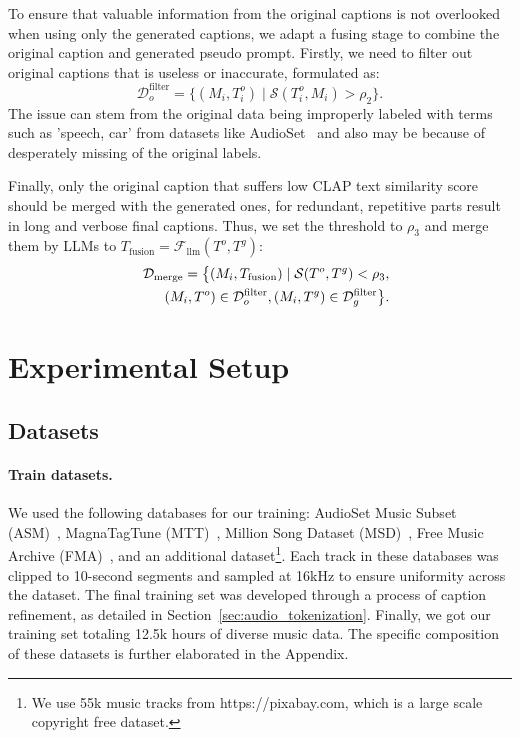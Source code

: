 To ensure that valuable information from the original captions is not overlooked when using only the generated captions, we adapt a fusing stage to combine the original caption and generated pseudo prompt. Firstly, we need to filter out original captions that is useless or inaccurate, formulated as:
\begin{equation}
\mathcal{D}^{\text{filter}}_{o} = \{(M_i, T^{o}_i) \mid \mathcal{S}(T^{o}_i, M_i) > \rho_2\}.
\end{equation}
The issue can stem from the original data being improperly labeled with terms such as 'speech, car' from datasets like AudioSet~\citep{gemmeke2017audio} and also may be because of desperately missing of the original labels.

Finally, only the original caption that suffers low CLAP text similarity score should be merged with the generated ones, for redundant, repetitive parts result in long and verbose final captions. Thus, we set the threshold to \(\rho_3\) and merge them by LLMs to \(T_{\text{fusion}} = \mathcal{F}_{\text{llm}}(T^{o}, T^{g})\):
\begin{equation}
\begin{aligned}
\mathcal{D}_{\text{merge}} = \big\{ (M_i, T_{\text{fusion}}) \mid \mathcal{S}(T^{o}, T^{g}) < \rho_3, \\
\hspace*{2.5em}(M_i, T^{o}) \in \mathcal{D}^{\text{filter}}_{o}, (M_i, T^{g}) \in \mathcal{D}^{\text{filter}}_{g} \big\}.
\end{aligned}
\end{equation}

\section{Experimental Setup}\label{sec:exp}

\subsection{Datasets}\label{sec:datasets}
\paragraph{Train datasets.} We used the following databases for our training: AudioSet Music Subset (ASM)~\citep{gemmeke2017audio}, MagnaTagTune (MTT)~\citep{law2009evaluation}, Million Song Dataset (MSD)~\citep{bertin2011million}, Free Music Archive (FMA)~\citep{defferrard2016fma}, and an additional dataset\footnote{We use 55k music tracks from https://pixabay.com, which is a large scale copyright free dataset.}. Each track in these databases was clipped to 10-second segments and sampled at 16kHz to ensure uniformity across the dataset. The final training set was developed through a process of caption refinement, as detailed in Section~\ref{sec:audio_tokenization}. Finally, we got our training set totaling 12.5k hours of diverse music data. The specific composition of these datasets is further elaborated in the Appendix.

